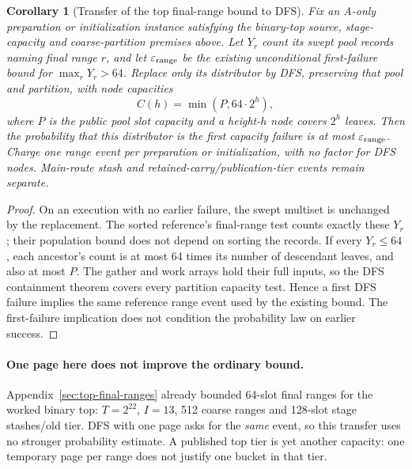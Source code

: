 \documentclass[11pt]{article}
\newtheorem{corollary}[theorem]{Corollary}
\theoremstyle{definition}
\theoremstyle{remark}
\begin{document}
\begin{corollary}[Transfer of the top final-range bound to DFS]
\label{cor:top-dfs-transfer}
Fix an A-only preparation or initialization instance satisfying the
binary-top source, stage-capacity and coarse-partition premises above.
Let $Y_r$ count its swept pool records naming final range $r$, and let
$\varepsilon_{\rm range}$ be the existing unconditional first-failure
bound for $\max_r Y_r>64$. Replace only its distributor by DFS, preserving
that pool and partition, with node capacities
\[
 C(h)=\min(P,64\cdot2^h),
\]
where $P$ is the public pool slot capacity and a height-$h$ node covers
$2^h$ leaves. Then the probability that this distributor is the first
capacity failure is at most $\varepsilon_{\rm range}$. Charge one range
event per preparation or initialization, with no factor for DFS nodes.
Main-route stash and retained-carry/publication-tier events remain separate.
\end{corollary}
\begin{proof}
On an execution with no earlier failure, the swept multiset is unchanged
by the replacement. The sorted reference's final-range test counts exactly these
$Y_r$; their population bound does not depend on sorting the records.
If every $Y_r\le64$, each ancestor's count is at most 64 times its number
of descendant leaves, and also at most $P$. The gather and work arrays
hold their full inputs, so the DFS containment theorem covers every
partition capacity test. Hence a first DFS failure implies the same
reference range event used by the existing bound. The first-failure
implication does not condition the probability law on earlier success.
\end{proof}

\paragraph{One page here does not improve the ordinary bound.}
Appendix~\ref{sec:top-final-ranges} already bounded 64-slot final ranges
for the worked binary top: $T=2^{22}$, $I=13$, 512 coarse ranges and
128-slot stage stashes/old tier. DFS with one page asks for the \emph{same} event, so this
transfer uses no stronger probability estimate. A published top tier is yet another capacity:
one temporary page per range does not justify one bucket in that tier.
\end{document}
